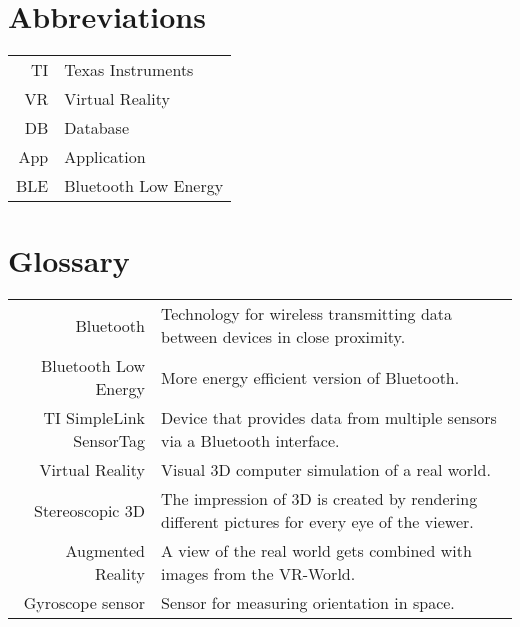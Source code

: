 \section{Abbreviations}

\begin{tabular}{rl}
TI & Texas Instruments\\
VR & Virtual Reality\\
DB & Database\\
App & Application\\
BLE & Bluetooth Low Energy\\

\end{tabular}
\bigskip

\section{Glossary}

\begin{tabular}{r p{11cm}}
Bluetooth & Technology for wireless transmitting data between devices in close proximity.\\
Bluetooth Low Energy & More energy efficient version of Bluetooth.\\
TI SimpleLink SensorTag & Device that provides data from multiple sensors via a Bluetooth interface.\\
Virtual Reality & Visual 3D computer simulation of a real world.\\
Stereoscopic 3D & The impression of 3D is created by rendering different pictures for every eye of the viewer.\\
Augmented Reality & A view of the real world gets combined with images from the VR-World.\\
Gyroscope sensor & Sensor for measuring orientation in space.\\
\end{tabular}